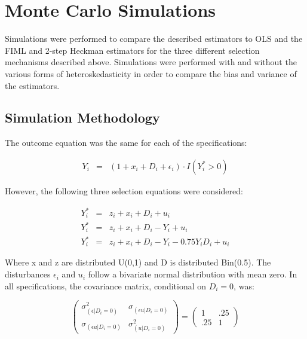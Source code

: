\documentclass{article}
\begin{document}
\section{Monte Carlo Simulations}
Simulations were performed to compare the described estimators to OLS and the FIML and 2-step Heckman estimators for the three different selection mechanisms described above. Simulations were performed with and without the various forms of heteroskedasticity in order to compare the bias and variance of the estimators.

\subsection{Simulation Methodology} \label{section:trans}

The outcome equation was the same for each of the specifications:

\begin{eqnarray*}
Y_i&=&(1 + x_i + D_i + \epsilon_i)\cdot I(Y^*_i>0)
\end{eqnarray*}

However, the following three selection equations were considered:

\begin{eqnarray}
Y^*_i&=& z_i + x_i + D_i + u_i \\
Y^*_i&=& z_i + x_i + D_i - Y_i + u_i  \\
Y^*_i&=& z_i + x_i + D_i - Y_i - 0.75Y_iD_i + u_i
\end{eqnarray}

Where x and z are distributed U(0,1) and D is distributed Bin(0.5).  The disturbances $\epsilon_i$ and $u_i$ follow a bivariate normal distribution with mean zero.  In all specifications, the covariance matrix, conditional on $D_i=0$, was:

\[\left( \begin{array}{cc}
\sigma_{(\epsilon|D_i=0)}^2 & \sigma_{(\epsilon u|D_i=0)} \\
\sigma_{(\epsilon u|D_i=0)} & \sigma_{(u|D_i=0)}^2  \end{array} \right) 
=
\left( \begin{array}{cc}
1 & .25 \\
.25 & 1  \end{array} \right)\] 
\end{document}
